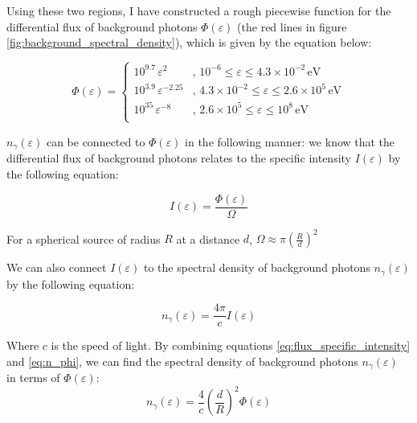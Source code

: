 Using these two regions, I have constructed a rough piecewise function for the differential flux of background photons $\Phi(\varepsilon)$ (the red lines in figure \ref{fig:background_spectral_density}), which is given by the equation below:

\begin{equation}
    \label{eq:piecewise_phi}
    \Phi(\varepsilon) = \left\{
    \begin{array}{ll}
        10^{9.7}\,\varepsilon^2 & \text{, } 10^{-6} \leq \varepsilon \leq 4.3 \times 10^{-2} \, \text{eV}\\
        10^{3.9}\,\varepsilon^{-2.25} & \text{, } 4.3 \times 10^{-2} \leq \varepsilon \leq 2.6 \times 10^{5} \, \text{eV}\\
        10^{35}\,\varepsilon^{-8} & \text{, } 2.6 \times 10^{5} \leq \varepsilon \leq 10^{8} \, \text{eV}\\
        
    \end{array}
    \right.
\end{equation}

$n_{\gamma}(\varepsilon)$ can be connected to $\Phi(\varepsilon)$ in the following manner: we know that the differential flux of background photons relates to the specific intensity $I(\varepsilon)$ by the following equation:

\begin{equation}
    I(\varepsilon) = \frac{\Phi(\varepsilon)}{\Omega}
    \label{eq:flux_specific_intensity}
\end{equation}

For a spherical source of radius $R$ at a distance $d$, $\Omega \approx \pi \left(\frac{R}{d}\right)^2$

We can also connect $I(\varepsilon)$ to the spectral density of background photons $n_{\gamma}(\varepsilon)$ by the following equation:

\begin{equation}
    n_{\gamma}(\varepsilon) = \frac{4\pi}{c}I(\varepsilon)
    \label{eq:n_phi}
\end{equation}

Where $c$ is the speed of light. By combining equations \ref{eq:flux_specific_intensity} and \ref{eq:n_phi}, we can find the spectral density of background photons $n_{\gamma}(\varepsilon)$ in terms of $\Phi(\varepsilon)$:
\begin{equation}
    n_{\gamma}(\varepsilon) = \frac{4}{c}\left(\frac{d}{R}\right)^2\Phi(\varepsilon)
    \label{eq:n_gamma}
\end{equation}

